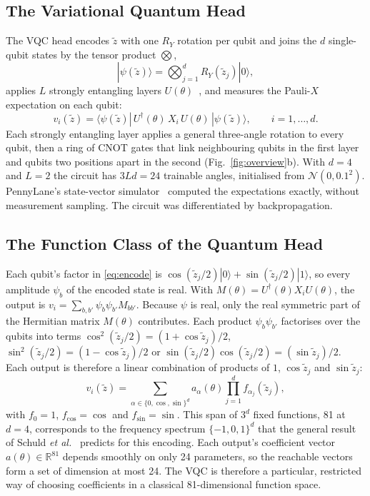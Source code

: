 \documentclass{ieeeaccess}
\newcommand{\vqc}{VQC}
\begin{document}
\subsection{The Variational Quantum Head}
The \vqc{} head encodes $\tilde z$ with one $R_Y$ rotation per qubit and joins the $d$ single-qubit states by the tensor product $\bigotimes$,
\begin{equation}
|\psi(\tilde z)\rangle=\bigotimes_{j=1}^{d}R_Y(\tilde z_j)|0\rangle ,
\label{eq:encode}
\end{equation}
applies $L$ strongly entangling layers $U(\theta)$~\cite{schuld2020circuit}, and measures the Pauli-$X$ expectation on each qubit:
\begin{equation}
v_i(\tilde z)=\langle\psi(\tilde z)|\,U^{\dagger}(\theta)\,X_i\,U(\theta)\,|\psi(\tilde z)\rangle ,\qquad i=1,\dots,d .
\label{eq:readout}
\end{equation}
Each strongly entangling layer applies a general three-angle rotation to every qubit, then a ring of CNOT gates that link neighbouring qubits in the first layer and qubits two positions apart in the second (Fig.~\ref{fig:overview}b). With $d=4$ and $L=2$ the circuit has $3Ld=24$ trainable angles, initialised from $\mathcal{N}(0,0.1^2)$. PennyLane's state-vector simulator~\cite{bergholm2018} computed the expectations exactly, without measurement sampling. The circuit was differentiated by backpropagation.

\subsection{The Function Class of the Quantum Head}
\label{sec:theory}
Each qubit's factor in \eqref{eq:encode} is $\cos(\tilde z_j/2)|0\rangle+\sin(\tilde z_j/2)|1\rangle$, so every amplitude $\psi_b$ of the encoded state is real. With $M(\theta)=U^\dagger(\theta)X_iU(\theta)$, the output is $v_i=\sum_{b,b'}\psi_b\psi_{b'}M_{bb'}$. Because $\psi$ is real, only the real symmetric part of the Hermitian matrix $M(\theta)$ contributes. Each product $\psi_b\psi_{b'}$ factorises over the qubits into terms $\cos^2(\tilde z_j/2)=(1+\cos\tilde z_j)/2$, $\sin^2(\tilde z_j/2)=(1-\cos\tilde z_j)/2$ or $\sin(\tilde z_j/2)\cos(\tilde z_j/2)=(\sin\tilde z_j)/2$. Each output is therefore a linear combination of products of $1$, $\cos\tilde z_j$ and $\sin\tilde z_j$:
\begin{equation}
v_i(\tilde z)=\sum_{\alpha\in\{0,\cos,\sin\}^d} a_\alpha(\theta)\prod_{j=1}^{d}f_{\alpha_j}(\tilde z_j),
\label{eq:span}
\end{equation}
with $f_0=1$, $f_{\cos}=\cos$ and $f_{\sin}=\sin$. This span of $3^d$ fixed functions, 81 at $d=4$, corresponds to the frequency spectrum $\{-1,0,1\}^d$ that the general result of Schuld \emph{et al.}~\cite{schuld2021} predicts for this encoding. Each output's coefficient vector $a(\theta)\in\mathbb{R}^{81}$ depends smoothly on only 24 parameters, so the reachable vectors form a set of dimension at most 24. The \vqc{} is therefore a particular, restricted way of choosing coefficients in a classical 81-dimensional function space.
\end{document}
